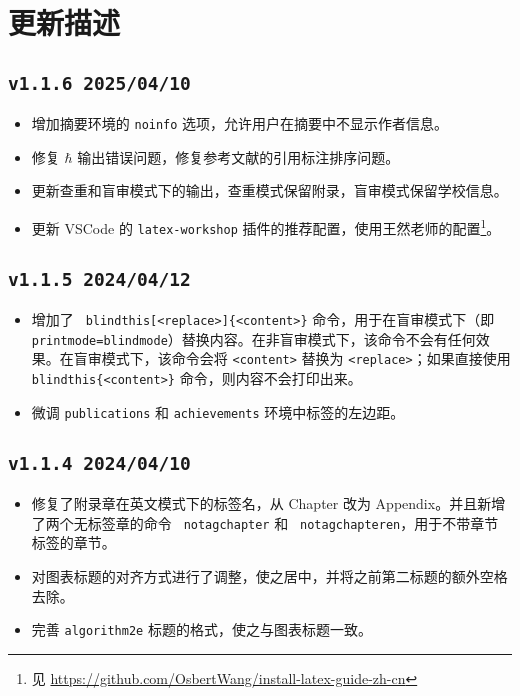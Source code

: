 \chapter{更新描述}

\section*{\texttt{v1.1.6 2025/04/10}}
\begin{itemize}
    \item 增加摘要环境的 \texttt{noinfo} 选项，允许用户在摘要中不显示作者信息。
    \item 修复 $\hbar$ 输出错误问题，修复参考文献的引用标注排序问题。
    \item 更新查重和盲审模式下的输出，查重模式保留附录，盲审模式保留学校信息。
    \item 更新 VSCode 的 \texttt{latex-workshop} 插件的推荐配置，使用王然老师的配置\footnote{见 \url{https://github.com/OsbertWang/install-latex-guide-zh-cn}}。
\end{itemize}

\section*{\texttt{v1.1.5 2024/04/12}}
\begin{itemize}
    \item 增加了 \texttt{ blindthis[<replace>]\{<content>\}} 命令，用于在盲审模式下（即 \texttt{printmode=blindmode}）替换内容。在非盲审模式下，该命令不会有任何效果。在盲审模式下，该命令会将 \texttt{<content>} 替换为 \texttt{<replace>}；如果直接使用 \texttt{ blindthis\{<content>\}} 命令，则内容不会打印出来。
    \item 微调 \texttt{publications} 和 \texttt{achievements} 环境中标签的左边距。
\end{itemize}

\section*{\texttt{v1.1.4 2024/04/10}}
\begin{itemize}
    \item 修复了附录章在英文模式下的标签名，从 Chapter 改为 Appendix。并且新增了两个无标签章的命令 \texttt{ notagchapter} 和 \texttt{ notagchapteren}，用于不带章节标签的章节。
    \item 对图表标题的对齐方式进行了调整，使之居中，并将之前第二标题的额外空格去除。
    \item 完善 \texttt{algorithm2e} 标题的格式，使之与图表标题一致。
\end{itemize}

